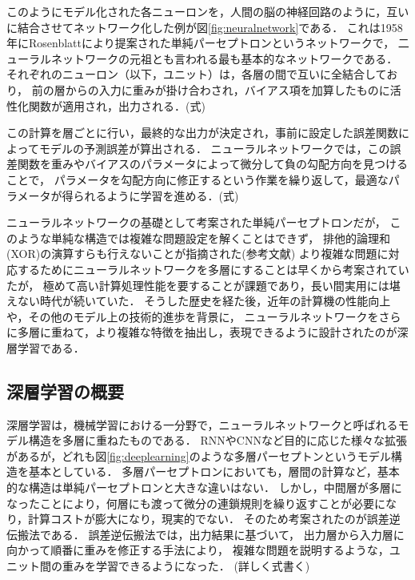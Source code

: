 
このようにモデル化された各ニューロンを，人間の脳の神経回路のように，互いに結合させてネットワーク化した例が図\ref{fig:neuralnetwork}である．
これは1958年にRosenblattにより提案された単純パーセプトロンというネットワークで，
二ューラルネットワークの元祖とも言われる最も基本的なネットワークである\cite{rosenblatt1958perceptron}．
それぞれのニューロン（以下，ユニット）は，各層の間で互いに全結合しており，
前の層からの入力に重みが掛け合わされ，バイアス項を加算したものに活性化関数が適用され，出力される．(式)

この計算を層ごとに行い，最終的な出力が決定され，事前に設定した誤差関数によってモデルの予測誤差が算出される．
ニューラルネットワークでは，この誤差関数を重みやバイアスのパラメータによって微分して負の勾配方向を見つけることで，
パラメータを勾配方向に修正するという作業を繰り返して，最適なパラメータが得られるように学習を進める．(式)


ニューラルネットワークの基礎として考案された単純パーセプトロンだが，
このような単純な構造では複雑な問題設定を解くことはできず，
排他的論理和(XOR)の演算すらも行えないことが指摘された(参考文献)
より複雑な問題に対応するためにニューラルネットワークを多層にすることは早くから考案されていたが，
極めて高い計算処理性能を要することが課題であり，長い間実用には堪えない時代が続いていた．
そうした歴史を経た後，近年の計算機の性能向上や，その他のモデル上の技術的進歩を背景に，
ニューラルネットワークをさらに多層に重ねて，より複雑な特徴を抽出し，表現できるように設計されたのが深層学習である．


\subsection{深層学習の概要}
深層学習は，機械学習における一分野で，ニューラルネットワークと呼ばれるモデル構造を多層に重ねたものである．
RNNやCNNなど目的に応じた様々な拡張があるが，どれも図\ref{fig:deeplearning}のような多層パーセプトンというモデル構造を基本としている．
多層パーセプトロンにおいても，層間の計算など，基本的な構造は単純パーセプトロンと大きな違いはない．
しかし，中間層が多層になったことにより，何層にも渡って微分の連鎖規則を繰り返すことが必要になり，計算コストが膨大になり，現実的でない．
そのため考案されたのが誤差逆伝搬法\cite{rumelhart1988learning}である．
誤差逆伝搬法では，出力結果に基づいて，
出力層から入力層に向かって順番に重みを修正する手法により，
複雑な問題を説明するような，ユニット間の重みを学習できるようになった．
(詳しく式書く)

